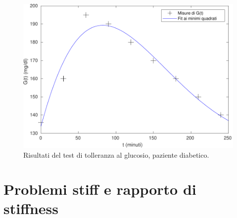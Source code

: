 \begin{figure}[p]
\centering
\includegraphics[height=0.27\textheight]{diabete2.pdf}
\caption{Risultati del test di tolleranza al glucosio, paziente diabetico.}
\label{fig:paziente-diabetico}
\end{figure}



\section{Problemi stiff e rapporto di stiffness}

